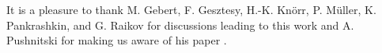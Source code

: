 It is a pleasure to thank M. Gebert, F. Gesztesy, H.-K. Kn\"orr,
P. M\"uller, K. Pankrashkin, and G. Raikov for discussions leading to this work
and A. Pushnitski for making us aware of his paper \cite{FrankPushnitski2015}.
